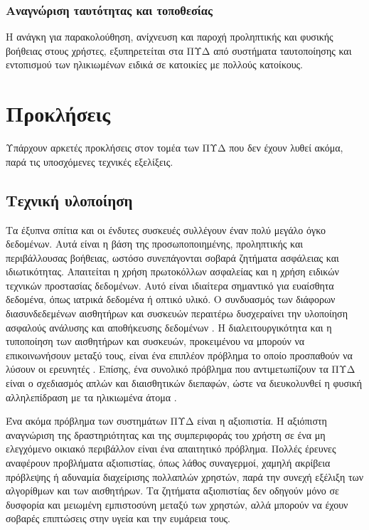 \subsubsection{Αναγνώριση ταυτότητας και τοποθεσίας}
Η ανάγκη για παρακολούθηση, ανίχνευση και παροχή προληπτικής και φυσικής βοήθειας στους χρήστες, εξυπηρετείται στα ΠΥΔ από συστήματα ταυτοποίησης και εντοπισμού των ηλικιωμένων ειδικά σε κατοικίες με πολλούς κατοίκους.

\section{Προκλήσεις}
Υπάρχουν αρκετές προκλήσεις στον τομέα των ΠΥΔ που δεν έχουν λυθεί ακόμα, παρά τις υποσχόμενες τεχνικές εξελίξεις.
\subsection{Τεχνική υλοποίηση}
Τα έξυπνα σπίτια και οι ένδυτες συσκευές συλλέγουν έναν πολύ μεγάλο όγκο δεδομένων.
Αυτά είναι η βάση της προσωποποιημένης, προληπτικής και περιβάλλουσας βοήθειας, ωστόσο συνεπάγονται σοβαρά ζητήματα ασφάλειας και ιδιωτικότητας.
Απαιτείται η χρήση πρωτοκόλλων ασφαλείας και η χρήση ειδικών τεχνικών προστασίας δεδομένων.
Αυτό είναι ιδιαίτερα σημαντικό για ευαίσθητα δεδομένα, όπως ιατρικά δεδομένα ή οπτικό υλικό.
Ο συνδυασμός των διάφορων διασυνδεδεμένων αισθητήρων και συσκευών περαιτέρω δυσχεραίνει την υλοποίηση ασφαλούς ανάλυσης και αποθήκευσης δεδομένων \cite{Acampora2013}\cite{Ghayvat2015}\cite{rashidi2012survey}.
Η διαλειτουργικότητα και η τυποποίηση των αισθητήρων και συσκευών, προκειμένου να μπορούν να επικοινωνήσουν μεταξύ τους, είναι ένα επιπλέον πρόβλημα το οποίο προσπαθούν να λύσουν οι ερευνητές \cite{Memon2014}\cite{Queiros2013}.
Επίσης, ένα συνολικό πρόβλημα που αντιμετωπίζουν τα ΠΥΔ είναι ο σχεδιασμός απλών και διαισθητικών διεπαφών, ώστε να διευκολυνθεί η φυσική αλληλεπίδραση με τα ηλικιωμένα άτομα \cite{Queiros2013}\cite{Sun2009}.
\par
Ένα ακόμα πρόβλημα των συστημάτων ΠΥΔ είναι η αξιοπιστία.
Η αξιόπιστη αναγνώριση της δραστηριότητας και της συμπεριφοράς του χρήστη σε ένα μη ελεγχόμενο οικιακό περιβάλλον είναι ένα απαιτητικό πρόβλημα.
Πολλές έρευνες αναφέρουν προβλήματα αξιοπιστίας, όπως λάθος συναγερμοί, χαμηλή ακρίβεια πρόβλεψης ή αδυναμία διαχείρισης πολλαπλών χρηστών, παρά την συνεχή εξέλιξη των αλγορίθμων και των αισθητήρων.
Τα ζητήματα αξιοπιστίας δεν οδηγούν μόνο σε δυσφορία και μειωμένη εμπιστοσύνη μεταξύ των χρηστών, αλλά μπορούν να έχουν σοβαρές επιπτώσεις στην υγεία και την ευμάρεια τους.
